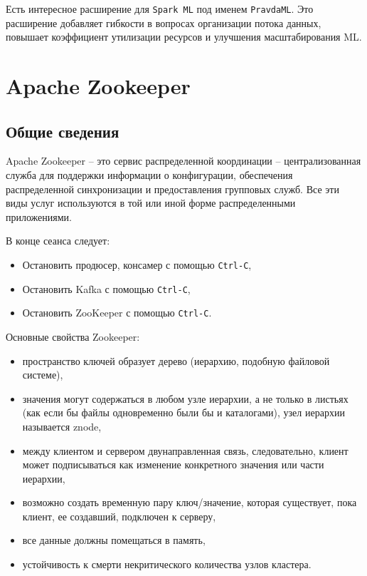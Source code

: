 \documentclass[%
	11pt,
	a4paper,
	utf8,
		]{article}
\begin{document}
Есть интересное расширение для \texttt{Spark ML} под именем \texttt{PravdaML}. Это расширение добавляет гибкости в вопросах организации потока данных, повышает коэффициент утилизации ресурсов и улучшения масштабирования ML.

\section{Apache Zookeeper}

\subsection{Общие сведения}

{Apache Zookeeper} -- это сервис распределенной координации -- централизованная служба для поддержки информации о конфигурации, обеспечения распределенной синхронизации и предоставления групповых служб. Все эти виды услуг используются в той или иной форме распределенными приложениями.

В конце сеанса следует:
\begin{itemize}
	\item Остановить продюсер, консамер с помощью \texttt{Ctrl-C},
	
	\item Остановить Kafka с помощью \texttt{Ctrl-C},
	
	\item Остановить ZooKeeper с помощью \texttt{Ctrl-C}.
\end{itemize}

Основные свойства Zookeeper:
\begin{itemize}
	\item пространство ключей образует дерево (иерархию, подобную файловой системе),
	
	\item значения могут содержаться в любом узле иерархии, а не только в листьях (как если бы файлы одновременно были бы и каталогами), узел иерархии называется znode,
	
	\item между клиентом и сервером двунаправленная связь, следовательно, клиент может подписываться как изменение конкретного значения или части иерархии,
	
	\item возможно создать временную пару ключ/значение, которая существует, пока клиент, ее создавший, подключен к серверу,
	
	\item все данные должны помещаться в память,
	
	\item устойчивость к смерти некритического количества узлов кластера.
\end{itemize}
\end{document}
